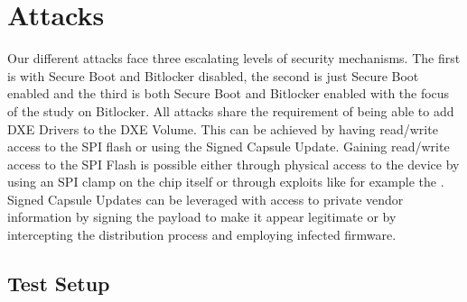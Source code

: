 
\chapter{Attacks}
Our different attacks face three escalating levels of security mechanisms. The first is with Secure Boot and Bitlocker disabled, the second is just Secure Boot enabled and the third is both Secure Boot and Bitlocker enabled with the focus of the study on Bitlocker.
All attacks share the requirement of being able to add DXE Drivers to the DXE Volume.
This can be achieved by having read/write access to the SPI flash or using the Signed Capsule Update. Gaining read/write access to the SPI Flash is possible either through physical access to the device by using an SPI clamp on the chip itself or through exploits like for example the
. Signed Capsule Updates can be leveraged with access to private vendor information by signing the payload to make it appear legitimate or by intercepting the distribution process and employing infected firmware.

\section{Test Setup}




